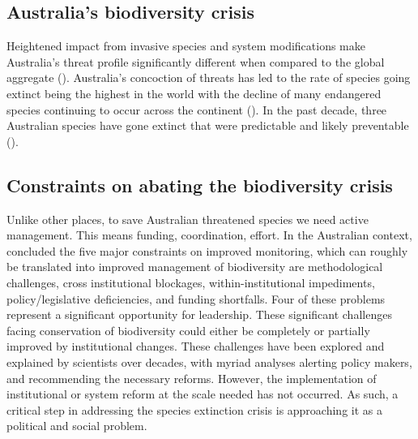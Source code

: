 \documentclass[a4paper,11pt]{article}
\begin{document}
\subsection{Australia's biodiversity crisis}

Heightened impact from invasive species and system modifications make Australia's threat profile significantly different when compared to the global aggregate (\cite{kearneyThreatsAustraliaImperilled2019}). Australia's concoction of threats has led to the rate of species going extinct being the highest in the world with the decline of many endangered species continuing to occur across the continent (\cite{simmondsVulnerableSpeciesEcosystems2020}). In the past decade, three Australian species have gone extinct that were predictable and likely preventable (\cite{woinarskiContributionPolicyLaw2017}).

\subsection{Constraints on abating the biodiversity crisis}

Unlike other places, to save Australian threatened species we need active management. This means funding, coordination, effort. 
In the Australian context, \cite{leggeMonitoringThreatenedSpecies2018} concluded the five major constraints on improved monitoring, which can roughly be translated into improved management of biodiversity are methodological challenges, cross institutional blockages, within-institutional impediments, policy/legislative deficiencies, and funding shortfalls. 
Four of these problems represent a significant opportunity for leadership. 
These significant challenges facing conservation of biodiversity could either be completely or partially improved by institutional changes. These challenges have been explored and explained by scientists over decades, with myriad analyses alerting policy makers, and recommending the necessary reforms. However, the implementation of institutional or system reform at the scale needed has not occurred. As such, a critical step in addressing the species extinction crisis is approaching it as a political and social problem.
\end{document}
